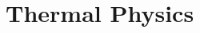 \documentclass{article}
\begin{document}
\setcounter{section}{18}
\section{Thermal Physics}



\end{document}
